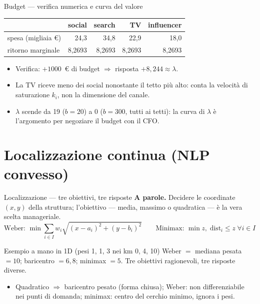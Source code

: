 \documentclass[11pt,aspectratio=169]{beamer}
\begin{document}
\begin{frame}{Budget --- verifica numerica e curva del valore}
\begin{center}\small
\begin{tabular}{lrrrr}
\toprule
 & social & search & TV & influencer \\
\midrule
spesa (migliaia \euro) & 24,3 & 34,8 & 22,9 & 18,0 \\
ritorno marginale & 8,2693 & 8,2693 & 8,2693 & 8,2693 \\
\bottomrule
\end{tabular}
\end{center}
\begin{itemize}
  \item Verifica: $+1000$~\euro{} di budget $\Rightarrow$ risposta $+8{,}244 \approx \lambda$.
  \item La TV riceve meno dei social nonostante il tetto più alto: conta la
        \alert{velocità di saturazione} $k_i$, non la dimensione del canale.
  \item $\lambda$ scende da 19 ($b = 20$) a 0 ($b = 300$, tutti ai tetti): la curva
        di $\lambda$ è l'argomento per negoziare il budget con il CFO.
\end{itemize}
\end{frame}

\section{Localizzazione continua (NLP convesso)}

\begin{frame}{Localizzazione --- tre obiettivi, tre risposte}
\textbf{A parole.} Decidere le coordinate $(x, y)$ della struttura; l'obiettivo
--- media, massimo o quadratica --- è la vera scelta manageriale.
\[
\text{Weber: } \min \textstyle\sum_{i \in I} w_i \sqrt{(x - a_i)^2 + (y - b_i)^2}
\qquad
\text{Minimax: } \min z, \; \text{dist}_i \le z \;\forall i \in I
\]
\begin{block}{Esempio a mano in 1D (pesi 1, 1, 3 nei km 0, 4, 10)}
Weber $=$ mediana pesata $= 10$; baricentro $= 6{,}8$; minimax $= 5$.
Tre obiettivi ragionevoli, tre risposte diverse.
\end{block}
\begin{itemize}
  \item Quadratico $\Rightarrow$ baricentro pesato (forma chiusa); Weber: non
        differenziabile nei punti di domanda; minimax: centro del cerchio minimo,
        \alert{ignora i pesi}.
\end{itemize}
\end{frame}
\end{document}
